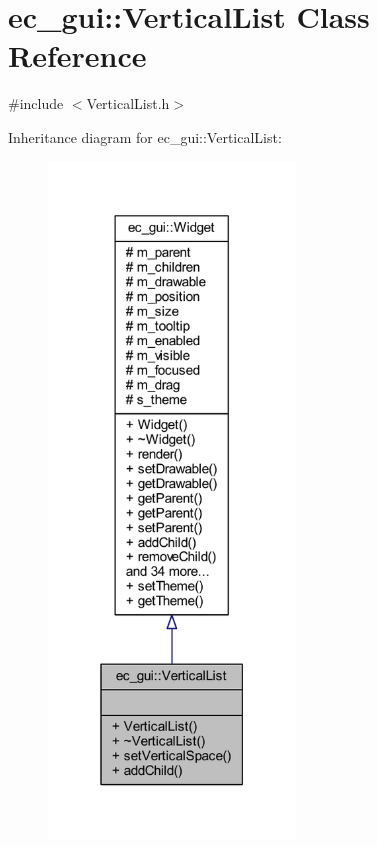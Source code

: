 \hypertarget{classec__gui_1_1_vertical_list}{}\section{ec\+\_\+gui\+:\+:Vertical\+List Class Reference}
\label{classec__gui_1_1_vertical_list}


{\ttfamily \#include $<$Vertical\+List.\+h$>$}



Inheritance diagram for ec\+\_\+gui\+:\+:Vertical\+List\+:\nopagebreak
\begin{figure}[H]
\begin{center}
\leavevmode
\includegraphics[width=186pt]{classec__gui_1_1_vertical_list__inherit__graph}
\end{center}
\end{figure}



